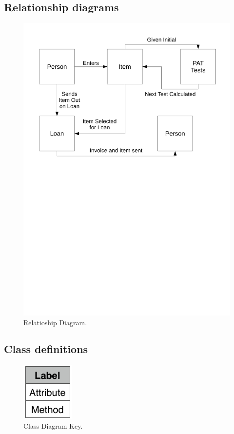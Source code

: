 \documentclass[a4paper,12pt]{report}
\begin{document}
\subsection{Relationship diagrams}

\begin{figure}[H]
    \caption{Relatioship Diagram.} \label{fig:relationship_diadram}
    \includegraphics[width=\textwidth]{./Relationship_Diagrams/Relationships_diagrams.pdf}
\end{figure}

\newpage

\subsection{Class definitions}

\begin{figure}[H]
    \caption{Class Diagram Key.} \label{fig:relationship_diagram}
    \centerline{\includegraphics[width=100px]{./Class_Definitions/Class_definition_key.pdf}}
\end{figure}
\end{document}
